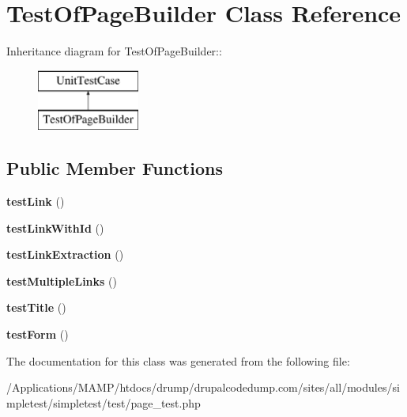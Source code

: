 \hypertarget{class_test_of_page_builder}{
\section{TestOfPageBuilder Class Reference}
\label{class_test_of_page_builder}
}
Inheritance diagram for TestOfPageBuilder::\begin{figure}[H]
\begin{center}
\leavevmode
\includegraphics[height=2cm]{class_test_of_page_builder}
\end{center}
\end{figure}
\subsection*{Public Member Functions}
\begin{DoxyCompactItemize}
\item 
\hypertarget{class_test_of_page_builder_a3ab9682f23d49c144d2909691e480b03}{
{\bfseries testLink} ()}
\label{class_test_of_page_builder_a3ab9682f23d49c144d2909691e480b03}

\item 
\hypertarget{class_test_of_page_builder_a7d29fed951a03e97688e71bea932b3c6}{
{\bfseries testLinkWithId} ()}
\label{class_test_of_page_builder_a7d29fed951a03e97688e71bea932b3c6}

\item 
\hypertarget{class_test_of_page_builder_aff680fc69fbe67fee8028718ae2f558c}{
{\bfseries testLinkExtraction} ()}
\label{class_test_of_page_builder_aff680fc69fbe67fee8028718ae2f558c}

\item 
\hypertarget{class_test_of_page_builder_a9be6fb46ed19cb15aab791d3e1ceb5a0}{
{\bfseries testMultipleLinks} ()}
\label{class_test_of_page_builder_a9be6fb46ed19cb15aab791d3e1ceb5a0}

\item 
\hypertarget{class_test_of_page_builder_a49dee0eee43bdf1f73ce6c98f0d01f04}{
{\bfseries testTitle} ()}
\label{class_test_of_page_builder_a49dee0eee43bdf1f73ce6c98f0d01f04}

\item 
\hypertarget{class_test_of_page_builder_a83dc4835f672f3ff72a65a8da3d7df4b}{
{\bfseries testForm} ()}
\label{class_test_of_page_builder_a83dc4835f672f3ff72a65a8da3d7df4b}

\end{DoxyCompactItemize}


The documentation for this class was generated from the following file:\begin{DoxyCompactItemize}
\item 
/Applications/MAMP/htdocs/drump/drupalcodedump.com/sites/all/modules/simpletest/simpletest/test/page\_\-test.php\end{DoxyCompactItemize}
